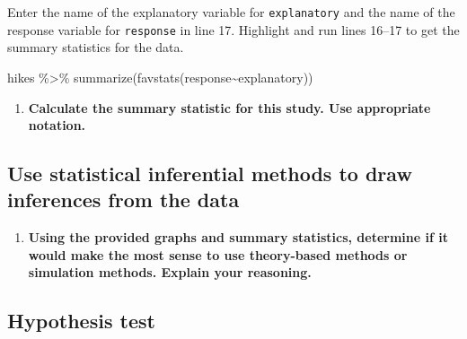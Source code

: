 \documentclass[
]{report}
\newenvironment{Shaded}{\begin{snugshade}}{\end{snugshade}}
\newcommand{\FunctionTok}[1]{\textcolor[rgb]{0.00,0.00,0.00}{#1}}
\newcommand{\NormalTok}[1]{#1}
\newcommand{\SpecialCharTok}[1]{\textcolor[rgb]{0.00,0.00,0.00}{#1}}
\providecommand{\tightlist}{%
  \setlength{\itemsep}{0pt}\setlength{\parskip}{0pt}}
\begin{document}
Enter the name of the explanatory variable for \texttt{explanatory} and the name of the response variable for \texttt{response} in line 17. Highlight and run lines 16--17 to get the summary statistics for the data.

\begin{Shaded}
\begin{Highlighting}[]
\NormalTok{hikes }\SpecialCharTok{\%\textgreater{}\%}
  \FunctionTok{summarize}\NormalTok{(}\FunctionTok{favstats}\NormalTok{(response}\SpecialCharTok{\textasciitilde{}}\NormalTok{explanatory))}
\end{Highlighting}
\end{Shaded}

\begin{enumerate}
\def\labelenumi{\arabic{enumi}.}
\setcounter{enumi}{6}
\tightlist
\item
  \textbf{Calculate the summary statistic for this study. Use appropriate notation.}
\end{enumerate}

\vspace{1in}

\hypertarget{use-statistical-inferential-methods-to-draw-inferences-from-the-data-2}{%
\subsection*{Use statistical inferential methods to draw inferences from the data}\label{use-statistical-inferential-methods-to-draw-inferences-from-the-data-2}}

\begin{enumerate}
\def\labelenumi{\arabic{enumi}.}
\setcounter{enumi}{7}
\tightlist
\item
  \textbf{Using the provided graphs and summary statistics, determine if it would make the most sense to use theory-based methods or simulation methods. Explain your reasoning.}
\end{enumerate}

\vspace{0.8in}

\hypertarget{hypothesis-test-1}{%
\subsection*{Hypothesis test}\label{hypothesis-test-1}}
\end{document}
